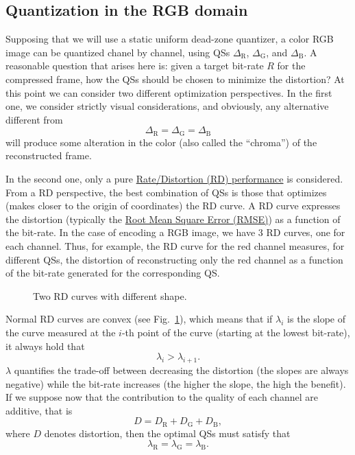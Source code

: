 \subsection{Quantization in the RGB domain}
Supposing that we will use a static uniform dead-zone quantizer, a
color RGB image can be quantized chanel by channel, using QSs
$\Delta_{\text{R}}$, $\Delta_{\text{G}}$, and $\Delta_{\text{B}}$. A
reasonable question that arises here is: given a target bit-rate $R$
for the compressed frame, how the QSs should be chosen to minimize the
distortion?  At this point we can consider two different optimization
perspectives. In the first one, we consider strictly visual
considerations, and obviously, any alternative different from
\begin{equation}
  \Delta_{\text{R}} = \Delta_{\text{G}} = \Delta_{\text{B}}
  \label{eq:simple_Q}
\end{equation}
will produce some alteration in the color (also called the
``chroma'') of the reconstructed frame.

In the second one, only a pure
\href{https://en.wikipedia.org/wiki/Rate-distortion_theory}{Rate/Distortion
  (RD) performance} is considered. From a RD perspective, the best
combination of QSs is those that optimizes (makes closer to the origin
of coordinates) the RD curve. A RD curve expresses the distortion
(typically the
\href{https://en.wikipedia.org/wiki/Root-mean-square_deviation}{Root
  Mean Square Error (RMSE)}) as a function of the bit-rate. In the
case of encoding a RGB image, we have 3 RD curves, one for each
channel. Thus, for example, the RD curve for the red channel measures,
for different QSs, the distortion of reconstructing only the red
channel as a function of the bit-rate generated for the corresponding
QS.

\begin{figure}
  \centering
  \caption{Two RD curves with different shape.}
  \label{fig:RD_slopes}
\end{figure}

Normal RD curves are convex (see Fig.~\ref{fig:RD_slopes}), which
means that if $\lambda_i$ is the slope of the curve measured at the
$i$-th point of the curve (starting at the lowest bit-rate), it always
hold that
\begin{equation}
  \lambda_i > \lambda_{i+1}.
\end{equation}
$\lambda$ quantifies the trade-off between decreasing the distortion
(the slopes are always negative) while the bit-rate increases (the
higher the slope, the high the benefit). If we suppose now that the
contribution to the quality of each channel are additive, that is
\begin{equation}
  D = D_{\text{R}} + D_{\text{G}} + D_{\text{B}},
\end{equation}
where $D$ denotes distortion, then the optimal QSs must satisfy
that~\cite{vetterli1995wavelets,sayood2017introduction}
\begin{equation}
  \lambda_{\text{R}} = \lambda_{\text{G}} = \lambda_{\text{B}}.
  \label{eq:optimal_quantization}
\end{equation}

